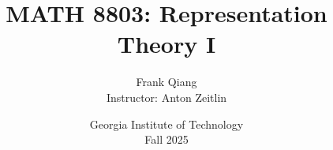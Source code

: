 \documentclass[12pt, letterpaper, oneside]{book}
\title{MATH 8803: Representation Theory I}
\author{Frank Qiang\\Instructor: Anton Zeitlin}
\date{Georgia Institute of Technology\\Fall 2025}
\theoremstyle{definition}
\begin{document}
  \maketitle

  \begingroup
  \let\cleardoublepage\clearpage
  \tableofcontents
  \endgroup

  
  
  
  
  
  
  
  
  
  
  
  
  
  
  
  
  
  
  
  
  
  
  
  
  
  
  
  
\end{document}
